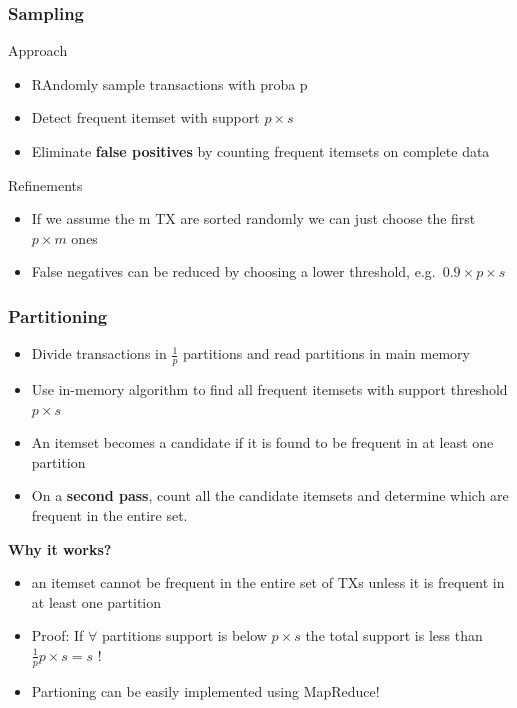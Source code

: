 \subsubsection{Sampling}
Approach
\begin{itemize}
\item RAndomly sample transactions with proba p
\item Detect frequent itemset with support $ p \times s $
\item Eliminate \textbf{false positives} by counting frequent itemsets
  on complete data
\end{itemize}

Refinements
\begin{itemize}
\item If we assume the m TX are sorted randomly we can just choose the
  first $ p \times m $ ones
\item False negatives can be reduced by choosing a lower threshold,
  e.g.\ $ 0.9 \times p \times s $
\end{itemize}

\subsubsection{Partitioning}
\begin{itemize}
\item Divide transactions in $\frac{1}{p}$ partitions and read
  partitions in main memory
\item Use in-memory algorithm to find all frequent itemsets with
  support threshold $ p \times s $
\item An itemset becomes a candidate if it is found to be frequent in
  at least one partition
\item On a \textbf{second pass}, count all the candidate itemsets and
  determine which are frequent in the entire set.
\end{itemize}

\textbf{Why it works?}
\begin{itemize}
\item an itemset cannot be frequent in the entire set of TXs unless it
  is frequent in at least one partition
\item Proof: If $ \forall $ partitions support is below $ p \times s $
  the total support is less than $ \frac{1}{p} p \times s = s $ !
\item Partioning can be easily implemented using MapReduce!
\end{itemize}

